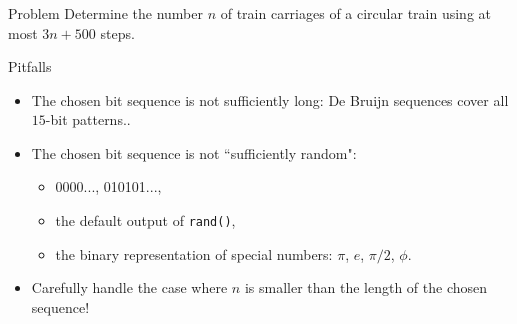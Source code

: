 \begin{frame}
    \frametitle{\problemtitle}

    \begin{block}{Problem}
        Determine the number $n$ of train carriages of a circular train using at most $3n + 500$ steps.
    \end{block}
    \begin{block}{Pitfalls}
        \begin{itemize}
            \item<+-> The chosen bit sequence is not sufficiently long: De
                Bruijn sequences cover all $15$-bit patterns..
            \item<+-> The chosen bit sequence is not ``sufficiently random":
            \begin{itemize}
              \item \textsc{0000...}, \textsc{010101...},
              \item the default output of \texttt{rand()},
              \item the binary representation of special numbers: $\pi$, $e$, $\pi/2$, $\phi$.
            \end{itemize}
            \item<+-> Carefully handle the case where $n$ is smaller than the length of the chosen sequence!
        \end{itemize}
    \end{block}
    \solvestats

\end{frame}

